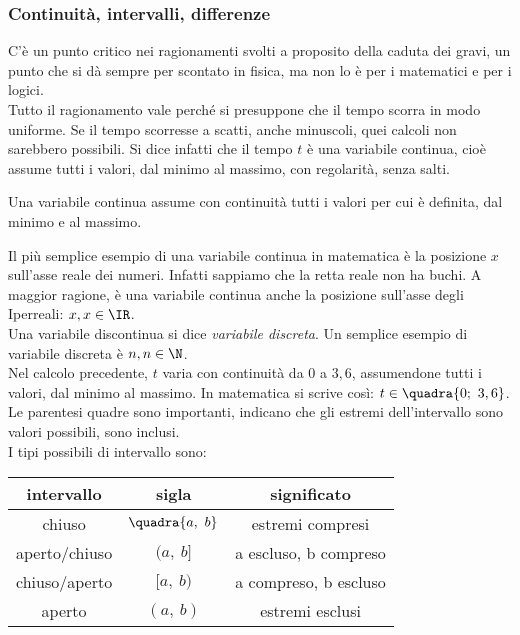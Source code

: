 \subsubsection{Continuità, intervalli, differenze}
\label{04_diffcontinterv}
C'è un punto critico nei ragionamenti svolti a proposito della caduta dei gravi,
un punto che si dà sempre per scontato in fisica, ma non lo è per i matematici
e per i logici.\\
Tutto il ragionamento vale perché si presuppone che il tempo scorra in modo
uniforme. Se il tempo scorresse a scatti, anche minuscoli, quei calcoli non
sarebbero possibili. Si dice infatti che il tempo $t$ è una variabile
continua, cioè assume tutti i valori, dal minimo al massimo, con regolarità,
senza salti.

\begin{definizione}
 Una variabile continua assume con continuità tutti i valori per cui è definita,
 dal minimo e al massimo.
\end{definizione}

Il più semplice esempio di una variabile continua in matematica è la 
posizione $x$ sull'asse reale dei numeri. Infatti sappiamo che la retta reale non
ha buchi. A maggior ragione, è una variabile continua anche la posizione sull'asse 
degli Iperreali: $x,x\in\IR$. \\
Una variabile discontinua si dice 
\emph{variabile discreta}. Un semplice esempio di variabile discreta è $n, n\in \N$.\\
Nel calcolo precedente, $t$ varia con continuità da $0$ a $3,6$,
assumendone tutti i valori, dal minimo al massimo. In matematica si scrive così:
\(t\in \quadra{0;\ 3,6}\). Le parentesi quadre sono importanti, indicano che gli estremi
dell'intervallo sono valori possibili, sono inclusi.\\
I tipi possibili di intervallo sono:

\begin{center}
\begin{tabular}{ccc}\toprule
intervallo & sigla & significato\\\midrule
chiuso &$\quadra{a,\ b}$  & estremi compresi\\
aperto/chiuso & $(a,\ b]$ & a escluso, b compreso\\
chiuso/aperto & $[a,\ b)$ & a compreso, b escluso\\
aperto & $(a,\ b)$ & estremi esclusi\\\bottomrule
\end{tabular}
\label{tab:diff_tipiinterv}
\end{center}

